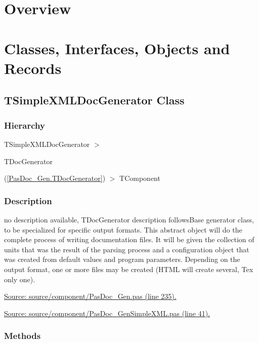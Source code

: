 \documentclass{report}
\newif\ifpdf
\begin{document}
\section{Overview}
\begin{description}
\item[\texttt{\begin{ttfamily}TSimpleXMLDocGenerator\end{ttfamily} Class}]
\end{description}
\section{Classes, Interfaces, Objects and Records}
\ifpdf
\subsection*{\large{\textbf{TSimpleXMLDocGenerator Class}}\normalsize\hspace{1ex}\hrulefill}
\else
\subsection*{TSimpleXMLDocGenerator Class}
\fi
\label{PasDoc_GenSimpleXML.TSimpleXMLDocGenerator}
\subsubsection*{\large{\textbf{Hierarchy}}\normalsize\hspace{1ex}\hfill}
TSimpleXMLDocGenerator {$>$} \begin{ttfamily}TDocGenerator\end{ttfamily}(\ref{PasDoc_Gen.TDocGenerator}) {$>$} 
TComponent
\subsubsection*{\large{\textbf{Description}}\normalsize\hspace{1ex}\hfill}
no description available, TDocGenerator description followsBase generator class, to be specialized for specific output formats. This abstract object will do the complete process of writing documentation files. It will be given the collection of units that was the result of the parsing process and a configuration object that was created from default values and program parameters. Depending on the output format, one or more files may be created (HTML will create several, Tex only one).\par
\href{https://github.com/pasdoc/pasdoc/blob/master/source/component/PasDoc_Gen.pas#L235}{Source: source/component/PasDoc{\_}Gen.pas (line 235).}\par
\href{https://github.com/pasdoc/pasdoc/blob/master/source/component/PasDoc_GenSimpleXML.pas#L41}{Source: source/component/PasDoc{\_}GenSimpleXML.pas (line 41).}\subsubsection*{\large{\textbf{Methods}}\normalsize\hspace{1ex}\hfill}
\end{document}
